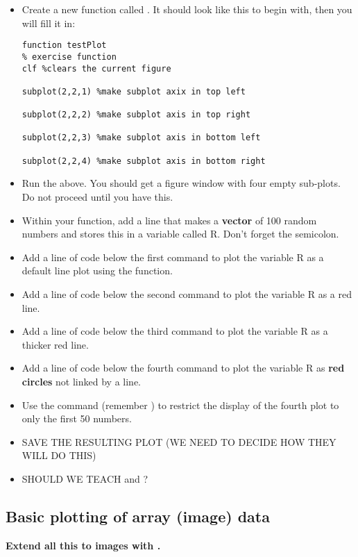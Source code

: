\documentclass{article}
\begin{document}
\begin{itemize}
\item Create a new function called . It should look like this to begin with, then you will fill it in:
\begin{lstlisting}
function testPlot
% exercise function
clf %clears the current figure

subplot(2,2,1) %make subplot axix in top left

subplot(2,2,2) %make subplot axis in top right

subplot(2,2,3) %make subplot axis in bottom left

subplot(2,2,4) %make subplot axis in bottom right

\end{lstlisting}

\item Run the above. You should get a figure window with four empty sub-plots. Do not proceed until you have this.

\item Within your function, add a line that makes a \textbf{vector} of 100 random numbers and stores this in a variable called R.
Don't forget the semicolon.
\item Add a line of code below the first  command to plot the variable R as a default line plot using the  function.
\item Add a line of code below the second  command to plot the variable R as a red line.
\item Add a line of code below the third  command to plot the variable R as a thicker red line.
\item Add a line of code below the fourth  command to plot the variable R as \textbf{red circles} not linked by a line.
\item Use the  command (remember ) to restrict the display of the fourth plot to only the first 50 numbers. 
\item SAVE THE RESULTING PLOT (WE NEED TO DECIDE HOW THEY WILL DO THIS)
\item SHOULD WE TEACH  and ?
\end{itemize}

\subsection*{Basic plotting of array (image) data}
\textbf{Extend all this to images with .}
\end{document}
